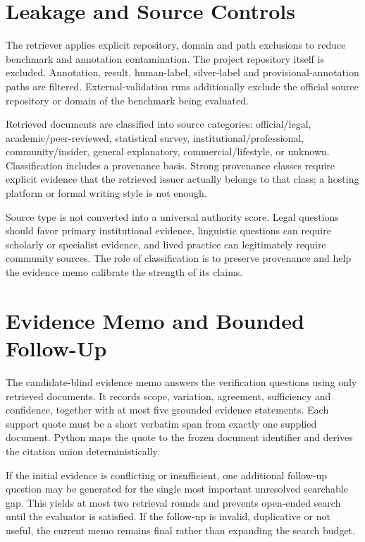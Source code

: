\section{Leakage and Source Controls}

The retriever applies explicit repository, domain and path exclusions to reduce benchmark and annotation contamination. The project repository itself is excluded. Annotation, result, human-label, silver-label and provisional-annotation paths are filtered. External-validation runs additionally exclude the official source repository or domain of the benchmark being evaluated.

Retrieved documents are classified into source categories: official/legal, academic/peer-reviewed, statistical survey, institutional/professional, community/insider, general explanatory, commercial/lifestyle, or unknown. Classification includes a provenance basis. Strong provenance classes require explicit evidence that the retrieved issuer actually belongs to that class; a hosting platform or formal writing style is not enough.

Source type is not converted into a universal authority score. Legal questions should favor primary institutional evidence, linguistic questions can require scholarly or specialist evidence, and lived practice can legitimately require community sources. The role of classification is to preserve provenance and help the evidence memo calibrate the strength of its claims.

\section{Evidence Memo and Bounded Follow-Up}

The candidate-blind evidence memo answers the verification questions using only retrieved documents. It records scope, variation, agreement, sufficiency and confidence, together with at most five grounded evidence statements. Each support quote must be a short verbatim span from exactly one supplied document. Python maps the quote to the frozen document identifier and derives the citation union deterministically.

If the initial evidence is conflicting or insufficient, one additional follow-up question may be generated for the single most important unresolved searchable gap. This yields at most two retrieval rounds and prevents open-ended search until the evaluator is satisfied. If the follow-up is invalid, duplicative or not useful, the current memo remains final rather than expanding the search budget.

